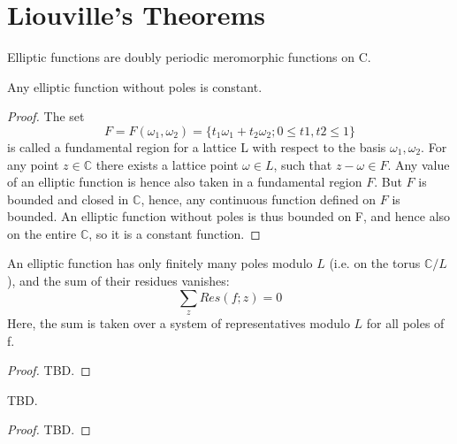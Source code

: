 \section{Liouville's Theorems}

\begin{definition}
    Elliptic functions are doubly periodic meromorphic functions on C.
\end{definition}

\begin{theorem}
    Any elliptic function without poles is constant.
\end{theorem}
\begin{proof}
    The set
    \[F = F(\omega_1, \omega_2) = \{ t_1 \omega_1 + t_2 \omega_2 ; 0 \leq t1, t2 \leq 1 \}\]
    is called a fundamental region for a lattice L with respect to the basis $\omega_1, \omega_2$.
    For any point $z \in \mathbb{C}$ there exists a lattice point $\omega \in L$, such that
    $z-\omega \in F$. Any value of an elliptic function is hence also taken in a fundamental region $F$.
    But $F$ is bounded and closed in $\mathbb{C}$, hence, any continuous function defined on $F$ is bounded.
    An elliptic function without poles is thus bounded on F, and hence also on the entire $\mathbb{C}$,
    so it is a constant function.
\end{proof}

\begin{theorem}
    An elliptic function has only finitely many poles modulo $L$ (i.e. on the torus $\mathbb{C} / L$), and the
    sum of their residues vanishes:
    \[ \sum_z Res(f; z)=0\]
    Here, the sum is taken over a system of representatives modulo $L$ for all poles of f.
\end{theorem}
\begin{proof}
    TBD.
\end{proof}

\begin{theorem}
    TBD.
\end{theorem}
\begin{proof}
    TBD.
\end{proof}